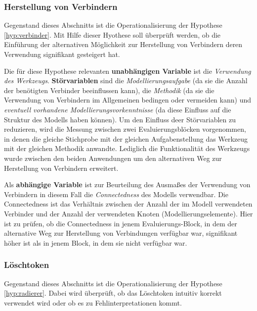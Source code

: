 
\subsubsection{Herstellung von Verbindern} %
\label{ssub:herstellung_von_verbindern}

Gegenstand dieses Abschnitts ist die Operationalisierung der Hypothese \ref{hyp:verbinder}. Mit Hilfe dieser Hyothese soll überprüft werden, ob die Einführung der alternativen Möglichkeit zur Herstellung von Verbindern deren Verwendung signifikant gesteigert hat.

Die für diese Hypothese relevanten \textbf{unabhängigen Variable} ist die \emph{Verwendung des Werkzeugs}. \textbf{Störvariablen} sind die \emph{Modellierungsaufgabe} (da sie die Anzahl der benötigten Verbinder beeinflussen kann), die \emph{Methodik} (da sie die Verwendung von Verbindern im Allgemeinen bedingen oder vermeiden kann) und \emph{eventuell vorhandene Modellierungsvorkenntnisse} (da diese Einfluss auf die Struktur des Modells haben können). Um den Einfluss deer Störvariablen zu reduzieren, wird die Messung zwischen zwei Evaluierungsblöcken vorgenommen, in denen die gleiche Stichprobe mit der gleichen Aufgabenstellung das Werkzeug mit der gleichen Methodik anwandte. Lediglich die Funktionalität des Werkzeugs wurde zwischen den beiden Anwendungen um den alternativen Weg zur Herstellung von Verbindern erweitert.  

Als \textbf{abhängige Variable} ist zur Beurteilung des Ausmaßes der Verwendung von Verbindern in diesem Fall die \emph{Connectedness} des Modells verwendbar. Die Connectedness ist das Verhältnis zwischen der Anzahl der im Modell verwendeten Verbinder und der Anzahl der verwendeten Knoten (Modellierungselemente). Hier ist zu prüfen, ob die Connectedness in jenem Evaluierungs-Block, in dem der alternative Weg zur Herstellung von Verbindungen verfügbar war, signifikant höher ist als in jenem Block, in dem sie nicht verfügbar war.


\subsubsection{Löschtoken} %
\label{ssub:löschtoken}

Gegenstand dieses Abschnitts ist die Operationalisierung der Hypothese \ref{hyp:radierer}. Dabei wird überprüft, ob das Löschtoken intuitiv korrekt verwendet wird oder ob es zu Fehlinterpretationen kommt.

